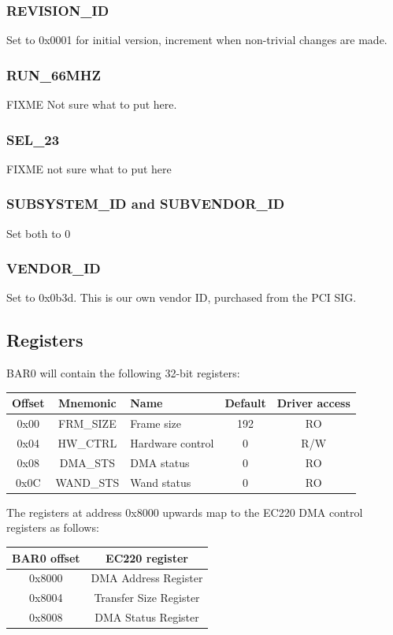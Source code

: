 \documentclass[12pt]{article}
\begin{document}
\subsubsection{REVISION\_ID}
Set to 0x0001 for initial version, increment when non-trivial changes are made.

\subsubsection{RUN\_66MHZ}
FIXME Not sure what to put here.

\subsubsection{SEL\_23}
FIXME not sure what to put here

\subsubsection{SUBSYSTEM\_ID and SUBVENDOR\_ID}
Set both to 0

\subsubsection{VENDOR\_ID}
Set to 0x0b3d. This is our own vendor ID, purchased from the PCI SIG.

\subsection{Registers}

BAR0 will contain the following 32-bit registers:

\begin{tabular}{|c|c|l|c|c|} \hline
\textbf{Offset} & \textbf{Mnemonic} & \textbf{Name} & \textbf{Default} & \textbf{Driver access} \\ \hline
0x00 & FRM\_SIZE & Frame size & 192 & RO \\ \hline
0x04 & HW\_CTRL & Hardware control & 0 & R/W \\ \hline
0x08 & DMA\_STS & DMA status & 0 & RO \\ \hline
0x0C & WAND\_STS & Wand status & 0 & RO \\ \hline
\end{tabular}

The registers at address 0x8000 upwards map to the EC220 DMA control registers
as follows:

\begin{tabular}{|c|c|} \hline
\textbf{BAR0 offset} & \textbf{EC220 register} \\ \hline
0x8000 & DMA Address Register \\ \hline
0x8004 & Transfer Size Register \\ \hline
0x8008 & DMA Status Register \\ \hline
\end{tabular}
\end{document}
